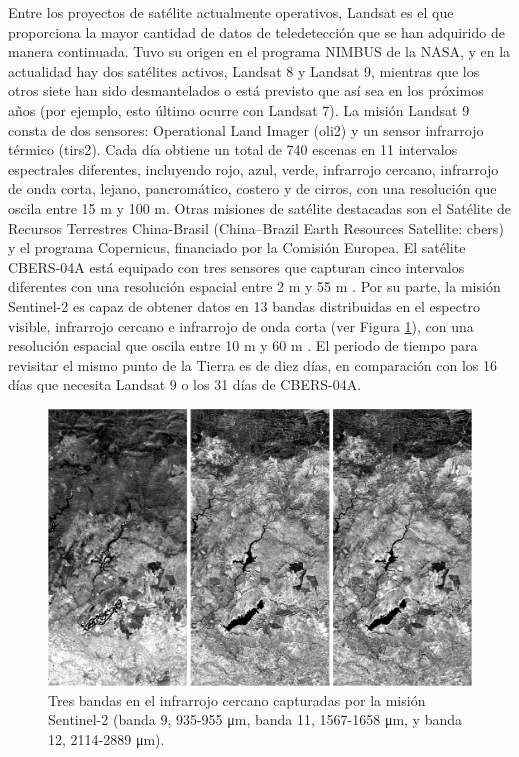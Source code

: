 Entre los proyectos de satélite actualmente operativos, Landsat es el que proporciona la mayor cantidad de datos de teledetección que se han adquirido de manera continuada. Tuvo su origen en el programa NIMBUS de la NASA, y en la actualidad hay dos satélites activos, Landsat 8 y Landsat 9, mientras que los otros siete han sido desmantelados o está previsto que así sea en los próximos años (por ejemplo, esto último ocurre con Landsat 7). La misión Landsat 9 consta de dos sensores: Operational Land Imager (\acrshort{oli2}) y un sensor infrarrojo térmico (\acrshort{tirs2}). Cada día obtiene un total de 740 escenas en 11 intervalos espectrales diferentes, incluyendo rojo, azul, verde, infrarrojo cercano, infrarrojo de onda corta, lejano, pancromático, costero y de cirros, con una resolución que oscila entre 15 \si{\meter} y 100 \si{\meter}. Otras misiones de satélite destacadas son el Satélite de Recursos Terrestres China-Brasil (China–Brazil Earth Resources Satellite: \acrshort{cbers}) y el programa Copernicus, financiado por la Comisión Europea. El satélite CBERS-04A está equipado con tres sensores que capturan cinco intervalos diferentes con una resolución espacial entre 2 \si{\meter} y 55 \si{\meter} \cite{instituto_nacional_de_pesquisas_espaciais_inpecbers_2019}. Por su parte, la misión Sentinel-2 es capaz de obtener datos en 13 bandas distribuidas en el espectro visible, infrarrojo cercano e infrarrojo de onda corta (ver Figura \ref{fig:sentinel2_spanish}), con una resolución espacial que oscila entre 10 \si{\meter} y 60 \si{\meter} \cite{european_environment_agency_eu_2017}. El periodo de tiempo para revisitar el mismo punto de la Tierra es de diez días, en comparación con los 16 días que necesita Landsat 9 o los 31 días de CBERS-04A.

\begin{figure}[!ht]
	\includegraphics{figs/introduction/sentinel2_bands.png}
	\caption{Tres bandas en el infrarrojo cercano capturadas por la misión Sentinel-2 (banda 9, 935-955 \si{\micro\meter}, banda 11, 1567-1658 \si{\micro\meter}, y banda 12, 2114-2889 \si{\micro\meter}). }
    \label{fig:sentinel2_spanish}
\end{figure} 

